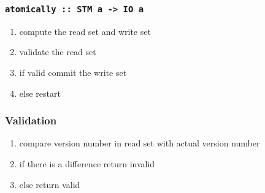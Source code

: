 \documentclass{beamer}
\begin{document}
%   
  \begin{frame}
   \frametitle{\lstinline{atomically :: STM a -> IO a}}
   \begin{enumerate}\setlength\itemsep{1em}
    \item compute the read set and write set
    \item validate the read set
    \item if valid commit the write set
    \item else restart
   \end{enumerate}
  \end{frame}

  \begin{frame}
   \frametitle{Validation}
    \begin{enumerate}\setlength\itemsep{1em}
      \item compare version number in read set with actual version number
      \item if there is a difference return invalid 
      \item else return valid
    \end{enumerate}
  \end{frame}

\end{document}
